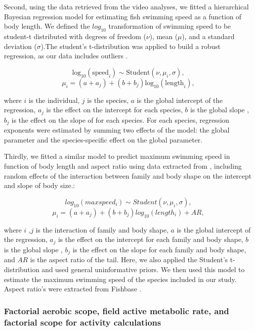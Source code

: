 \documentclass[
]{article}
\begin{document}
Second, using the data retrieved from the video analyses, we fitted a
hierarchical Bayesian regression model for estimating fish swimming
speed as a function of body length. We defined the \(log_{10}\)
transformation of swimming speed to be student-t distributed with
degrees of freedom (\(\nu\)), mean (\(\mu\)), and a standard deviation
(\(\sigma\)).The student's t-distribution was applied to build a robust
regression, as our data includes outliers \citep{Motulsky2006}.

\[\textrm{log}_{10}(\textrm{speed}_{i}) \sim \textrm{Student}(\nu, \mu_{i}, \sigma),\]
\[\mu_{i} = (a + a_{j}) + (b + b_{j})\textrm{log}_{10}(\textrm{length}_i),\]

where \(i\) is the individual, \(j\) is the species, \(a\) is the global
intercept of the regression, \(a_j\) is the effect on the intercept for
each species, \(b\) is the global slope , \(b_j\) is the effect on the
slope of for each species. For each species, regression exponents were
estimated by summing two effects of the model: the global parameter and
the species-specific effect on the global parameter.

Thirdly, we fitted a similar model to predict maximum swimming speed in
function of body length and aspect ratio using data extracted from
\citet{Fulton2007}, including random effects of the interaction between
family and body shape on the intercept and slope of body size.:

\[log_{10}(maxspeed_{i}) \sim Student(\nu, \mu_{i}, \sigma),\]
\[\mu_{i} = (a + a_{j}) + (b + b_{j})log_{10}(length_i) + AR,\]

where \(i\) ,\(j\) is the interaction of family and body shape, \(a\) is
the global intercept of the regression, \(a_j\) is the effect on the
intercept for each family and body shape, \(b\) is the global slope ,
\(b_j\) is the effect on the slope for each family and body shape, and
\(AR\) is the aspect ratio of the tail. Here, we also applied the
Student's t-distribution and used general uninformative priors. We then
used this model to estimate the maximum swimming speed of the species
included in our study. Aspect ratio's were extracted from Fishbase
\citep{Froese2014}.

\hypertarget{factorial-aerobic-scope-field-active-metabolic-rate-and-factorial-scope-for-activity-calculations}{%
\subsubsection{Factorial aerobic scope, field active metabolic rate, and
factorial scope for activity
calculations}\label{factorial-aerobic-scope-field-active-metabolic-rate-and-factorial-scope-for-activity-calculations}}
\end{document}
